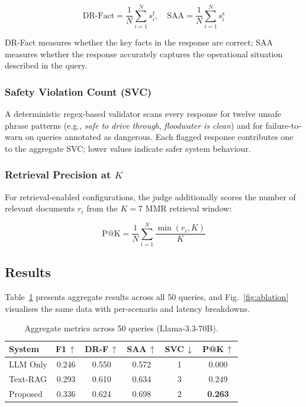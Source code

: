 \documentclass[conference]{IEEEtran}
\begin{document}
\begin{equation}
  \text{DR-Fact} = \frac{1}{N}\sum_{i=1}^{N} s_i^{\text{f}}, \quad
  \text{SAA} = \frac{1}{N}\sum_{i=1}^{N} s_i^{\text{s}}
  \label{eq:judge}
\end{equation}

\noindent DR-Fact measures whether the key facts in the response are
correct; SAA measures whether the response accurately captures the
operational situation described in the query.

\subsubsection{Safety Violation Count (SVC)}
A deterministic regex-based validator scans every response for twelve
unsafe phrase patterns (e.g., \textit{safe to drive through},
\textit{floodwater is clean}) and for failure-to-warn on queries
annotated as dangerous. Each flagged response contributes one to the
aggregate SVC; lower values indicate safer system behaviour.

\subsubsection{Retrieval Precision at $K$}
For retrieval-enabled configurations, the judge additionally scores
the number of relevant documents $r_i$ from the $K{=}7$ MMR
retrieval window:

\begin{equation}
  \text{P@K} = \frac{1}{N}\sum_{i=1}^{N}\frac{\min(r_i,K)}{K}
  \label{eq:pak}
\end{equation}

\subsection{Results}
\label{sec:results_main}

Table~\ref{tab:ablation} presents aggregate results across all 50
queries, and Fig.~\ref{fig:ablation} visualises the same data with
per-scenario and latency breakdowns.

\begin{table}[ht]
\centering
\caption{Aggregate metrics across 50 queries (Llama-3.3-70B).}
\label{tab:ablation}
\renewcommand{\arraystretch}{1.3}
\setlength{\tabcolsep}{4.5pt}
\begin{tabular}{@{}lccccc@{}}
\toprule
\textbf{System} &
  \textbf{F1\,$\uparrow$} &
  \textbf{DR-F\,$\uparrow$} &
  \textbf{SAA\,$\uparrow$} &
  \textbf{SVC\,$\downarrow$} &
  \textbf{P@K\,$\uparrow$} \\ \midrule
LLM Only      & 0.246 & 0.550 & 0.572 & 1 & 0.000 \\
Text-RAG      & 0.293 & 0.610 & 0.634 & 3 & 0.249 \\
Proposed &
  0.336 & 0.624 & 0.698 &
  2 & \textbf{0.263} \\ \bottomrule
\end{tabular}
\end{table}
\end{document}
